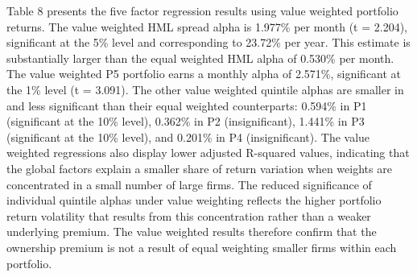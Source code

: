Table 8 presents the five factor regression results using value weighted portfolio returns. The value weighted HML spread alpha is 1.977\% per month (t = 2.204), significant at the 5\% level and corresponding to 23.72\% per year. This estimate is substantially larger than the equal weighted HML alpha of 0.530\% per month. The value weighted P5 portfolio earns a monthly alpha of 2.571\%, significant at the 1\% level (t = 3.091). The other value weighted quintile alphas are smaller in and less significant than their equal weighted counterparts: 0.594\% in P1 (significant at the 10\% level), 0.362\% in P2 (insignificant), 1.441\% in P3 (significant at the 10\% level), and 0.201\% in P4 (insignificant). The value weighted regressions also display lower adjusted R-squared values, indicating that the global factors explain a smaller share of return variation when weights are concentrated in a small number of large firms. The reduced significance of individual quintile alphas under value weighting reflects the higher portfolio return volatility that results from this concentration rather than a weaker underlying premium. The value weighted results therefore confirm that the ownership premium is not a result of equal weighting smaller firms within each portfolio. 


